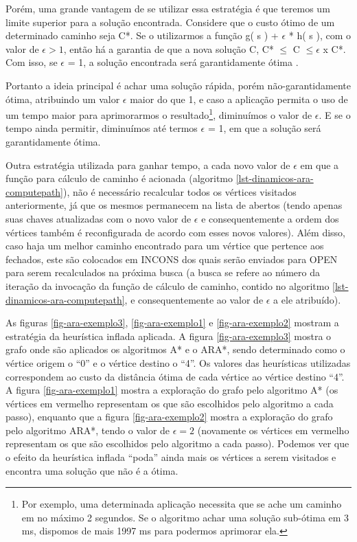 Porém, uma grande vantagem de se utilizar essa estratégia é que teremos um limite superior para a solução encontrada. Considere que o custo ótimo de um determinado caminho seja C*. Se o utilizarmos a função g( s ) + $\epsilon$ * h( s ), com o valor de $\epsilon > 1$, então há a garantia de que a nova solução C, C* $\leq$ C $\leq \epsilon$ x C*. Com isso, se $\epsilon$ = 1, a solução encontrada será garantidamente ótima \cite{moura2010estudo}.

Portanto a ideia principal é achar uma solução rápida, porém não-garantidamente ótima, atribuindo um valor $\epsilon$ maior do que 1, e caso a aplicação permita o uso de um tempo maior para aprimorarmos o resultado\footnote{Por exemplo, uma determinada aplicação necessita que se ache um caminho em no máximo 2 segundos. Se o algoritmo achar uma solução sub-ótima em 3 ms, dispomos de mais 1997 ms para podermos aprimorar ela.}, diminuímos o valor de $\epsilon$. E se o tempo ainda permitir, diminuímos até termos $\epsilon$ = 1, em que a solução será garantidamente ótima. 

Outra estratégia utilizada para ganhar tempo, a cada novo valor de $\epsilon$ em que a função para cálculo de caminho é acionada (algoritmo \ref{lst-dinamicos-ara-computepath}), não é necessário recalcular todos os vértices visitados anteriormente, já que os mesmos permanecem na lista de abertos (tendo apenas suas chaves atualizadas com o novo valor de $\epsilon$ e consequentemente a ordem dos vértices também é reconfigurada de acordo com esses novos valores). Além disso, caso haja um melhor caminho encontrado para um vértice que pertence aos fechados, este são colocados em INCONS dos quais serão enviados para OPEN para serem recalculados na próxima busca (a busca se refere ao número da iteração da invocação da função de cálculo de caminho, contido no algoritmo \ref{lst-dinamicos-ara-computepath}, e consequentemente ao valor de $\epsilon$ a ele atribuído).

As figuras \ref{fig-ara-exemplo3}, \ref{fig-ara-exemplo1} e \ref{fig-ara-exemplo2} mostram a estratégia da heurística inflada aplicada. A figura \ref{fig-ara-exemplo3} mostra o grafo onde são aplicados os algoritmos A* e o ARA*, sendo determinado como o vértice origem o ``0'' e o vértice destino o ``4''. Os valores das heurísticas utilizadas correspondem ao custo da distância ótima de cada vértice ao vértice destino ``4''. A figura \ref{fig-ara-exemplo1} mostra a exploração do grafo pelo algoritmo A* (os vértices em vermelho representam os que são escolhidos pelo algoritmo a cada passo), enquanto que a figura \ref{fig-ara-exemplo2} mostra a exploração do grafo pelo algoritmo ARA*, tendo o valor de $\epsilon = 2$ (novamente os vértices em vermelho representam os que são escolhidos pelo algoritmo a cada passo). Podemos ver que o efeito da heurística inflada ``poda'' ainda mais os vértices a serem visitados e encontra uma solução que não é a ótima.

